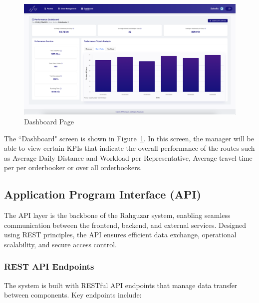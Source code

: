 \begin{figure}[H]
    \centering
    \includegraphics[width=1\textwidth]{images/dashboard.png} %
    \caption{Dashboard Page}
    \label{fig:image7}
\end{figure}
The ``Dashboard" screen is shown in Figure~\ref{fig:image7}. In this screen, the manager will be able to view certain KPIs that indicate the overall performance of the routes such as Average Daily Distance and Workload per Representative, Average travel time per per orderbooker or over all orderbookers. 

\subsection{Application Program Interface (API)}
The API layer is the backbone of the Rahguzar system, enabling seamless communication between the frontend, backend, and external services. Designed using REST principles, the API ensures efficient data exchange, operational scalability, and secure access control.

\subsubsection{REST API Endpoints}
The system is built with RESTful API endpoints that manage data transfer between components. Key endpoints include:


